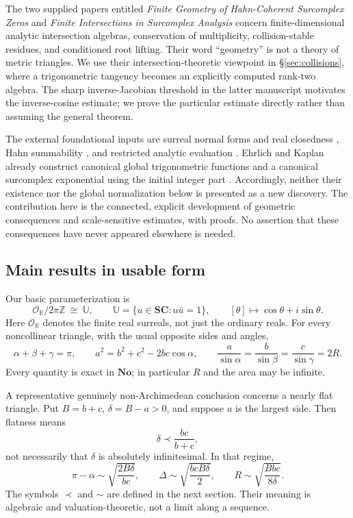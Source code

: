 \documentclass[11pt,letterpaper]{article}
\theoremstyle{definition}
\theoremstyle{remark}
\newcommand{\No}{\mathbf{No}}
\newcommand{\SC}{\mathbf{SC}}
\newcommand{\R}{\mathbb R}\newcommand{\C}{\mathbb C}
\newcommand{\Z}{\mathbb Z}\newcommand{\N}{\mathbb N}
\newcommand{\OO}{\mathcal O}\newcommand{\mm}{\mathfrak m}
\newcommand{\UU}{\mathbb U}\newcommand{\HH}{\mathcal H}
\numberwithin{equation}{section}
\begin{document}
The two supplied papers entitled \emph{Finite Geometry of Hahn-Coherent Surcomplex Zeros} \cite{InputGeometry} and \emph{Finite Intersections in Surcomplex Analysis} \cite{InputIntersections} concern finite-dimensional analytic intersection algebras, conservation of multiplicity, collision-stable residues, and conditioned root lifting. Their word ``geometry'' is not a theory of metric triangles. We use their intersection-theoretic viewpoint in \S\ref{sec:collisions}, where a trigonometric tangency becomes an explicitly computed rank-two algebra. The sharp inverse-Jacobian threshold in the latter manuscript motivates the inverse-cosine estimate; we prove the particular estimate directly rather than assuming the general theorem.

The external foundational inputs are surreal normal forms and real closedness \cite{Conway,Gonshor}, Hahn summability \cite{Neumann}, and restricted analytic evaluation \cite{vdDE,Alling}. Ehrlich and Kaplan already construct canonical global trigonometric functions and a canonical surcomplex exponential using the initial integer part \cite[\S11]{EK}. Accordingly, neither their existence nor the global normalization below is presented as a new discovery. The contribution here is the connected, explicit development of geometric consequences and scale-sensitive estimates, with proofs. No assertion that these consequences have never appeared elsewhere is needed.

\subsection{Main results in usable form}
Our basic parameterization is
\begin{equation}\label{eq:mainphase}
 \OO_{\R}/2\pi\Z\ \cong\ \UU,
 \qquad \UU=\{u\in\SC:u\bar u=1\},
 \qquad [\theta]\longmapsto\cos\theta+i\sin\theta.
\end{equation}
Here $\OO_{\R}$ denotes the finite real surreals, not just the ordinary reals. For every noncollinear triangle, with the usual opposite sides and angles,
\[
 \alpha+\beta+\gamma=\pi,\qquad
 a^2=b^2+c^2-2bc\cos\alpha,\qquad
 \frac a{\sin\alpha}=\frac b{\sin\beta}=\frac c{\sin\gamma}=2R.
\]
Every quantity is exact in $\No$; in particular $R$ and the area may be infinite.

A representative genuinely non-Archimedean conclusion concerns a nearly flat triangle. Put $B=b+c$, $\delta=B-a>0$, and suppose $a$ is the largest side. Then flatness means
\[
 \delta\prec\frac{bc}{b+c},
\]
not necessarily that $\delta$ is absolutely infinitesimal. In that regime,
\begin{equation}\label{eq:flatpreview}
 \pi-\alpha\sim\sqrt{\frac{2B\delta}{bc}},\qquad
 \Delta\sim\sqrt{\frac{bcB\delta}{2}},\qquad
 R\sim\sqrt{\frac{Bbc}{8\delta}}.
\end{equation}
The symbols $\prec$ and $\sim$ are defined in the next section. Their meaning is algebraic and valuation-theoretic, not a limit along a sequence.
\end{document}
